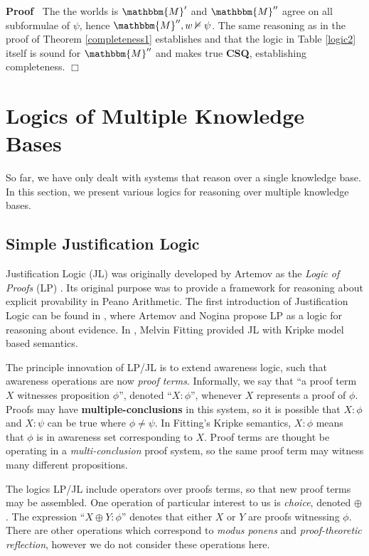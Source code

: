 \documentclass{article}
\newcommand{\tmem}[1]{{\em #1\/}}
\newcommand{\tmstrong}[1]{\textbf{#1}}
\newcommand{\tmtextbf}[1]{{\bfseries{#1}}}
\newcommand{\tmtextit}[1]{{\itshape{#1}}}
\newenvironment{proof}{\noindent\textbf{Proof\ }}{\hspace*{\fill}$\Box$\medskip}
\begin{document}
\begin{proof}
  The the worlds is $\mathbbm{M}'$ and $\mathbbm{M}''$ agree on all
  subformulae of $\psi$, hence $\mathbbm{M}'', w \nvDash \psi$. The same
  reasoning as in the proof of Theorem \ref{completeness1} establishes and
  that the logic in Table \ref{logic2} itself is sound for $\mathbbm{M}''$ and
  makes true \tmtextbf{CSQ}, establishing completeness.
\end{proof}

\section{Logics of Multiple Knowledge Bases}

So far, we have only dealt with systems that reason over a single knowledge
base.  In this section, we present various logics for reasoning over multiple
knowledge bases.

\subsection{Simple Justification Logic}

Justification Logic (JL) was originally developed by Artemov as the
\tmtextit{Logic of Proofs} (LP) {\cite{artemov_logic_1994}}.  Its original
purpose was to provide a framework for reasoning about explicit provability in
Peano Arithmetic.  The first introduction of Justification Logic can be found
in {\cite{artemov_introducing_2005}}, where Artemov and Nogina propose LP as a
logic for reasoning about evidence.  In {\cite{fitting_logic_2005}}, Melvin
Fitting provided JL with Kripke model based semantics.



The principle innovation of LP/JL is to extend awareness logic, such that
awareness operations are now \tmtextit{proof terms}.  Informally, we say that
``a proof term $X$ witnesses proposition $\phi$'', denoted ``$X : \phi$'',
whenever $X$ represents a proof of $\phi$.  Proofs may have
{\tmstrong{multiple-conclusions}} in this system, so it is possible that $X :
\phi$ and $X : \psi$ can be true where $\phi \neq \psi$.  In Fitting's Kripke
semantics, $X : \phi$ means that $\phi$ is in awareness set corresponding to
$X$.  Proof terms are thought be operating in a \tmtextit{multi-conclusion}
proof system, so the same proof term may witness many different propositions.



The logics LP/JL include operators over proofs terms, so that new proof terms
may be assembled.  One operation of particular interest to us is
{\tmem{choice}}, denoted $\oplus$.  The expression ``$X \oplus Y : \phi$''
denotes that either $X$ or $Y$ are proofs witnessing $\phi$.  There are other
operations which correspond to \tmtextit{modus ponens} and
\tmtextit{proof-theoretic reflection}, however we do not consider these
operations here.
\end{document}
